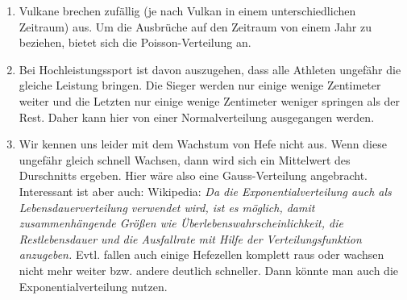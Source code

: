 \documentclass{homework}
\date{Montag, dem 14. Januar 2013}
\author{Stefan Meißner (4279113) und Niels Hoppe (4356370)}
\begin{document}
\maketitle
\begin{enumerate} 

\begin{enumerate}
\item 
Vulkane brechen zufällig (je nach Vulkan in einem unterschiedlichen Zeitraum) aus. 
Um die Ausbrüche auf den Zeitraum von einem Jahr zu beziehen, bietet sich die Poisson-Verteilung an.
\item 
Bei Hochleistungssport ist davon auszugehen, dass alle Athleten ungefähr die gleiche Leistung bringen.
Die Sieger werden nur einige wenige Zentimeter weiter und die Letzten nur einige wenige Zentimeter weniger springen als der Rest.
Daher kann hier von einer Normalverteilung ausgegangen werden.
\item
Wir kennen uns leider mit dem Wachstum von Hefe nicht aus. Wenn diese ungefähr gleich schnell Wachsen, dann wird sich ein Mittelwert des Durschnitts ergeben. Hier wäre also eine Gauss-Verteilung angebracht.\\
Interessant ist aber auch:
Wikipedia: \textit{Da die Exponentialverteilung auch als Lebensdauerverteilung verwendet wird, ist es möglich,
damit zusammenhängende Größen wie Überlebenswahrscheinlichkeit,
die Restlebensdauer und die Ausfallrate mit Hilfe der Verteilungsfunktion anzugeben.}
Evtl. fallen auch einige Hefezellen komplett raus oder wachsen nicht mehr weiter bzw. andere deutlich schneller. Dann könnte man auch die Exponentialverteilung nutzen.
\end{enumerate}



\end{enumerate}
\end{document}

